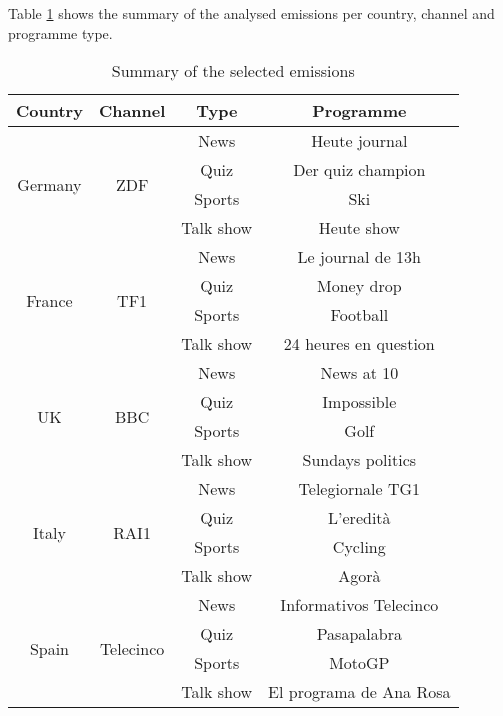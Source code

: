 Table \ref{tab:selEmissions} shows the summary of the analysed emissions per country, channel and programme type. 

\begin{table}[ht]
	\begin{center}
		\caption{Summary of the selected emissions}
		\label{tab:selEmissions}
		\begin{tabular}{||c|c|c|c||}
			\hline
			\textbf{Country} & \textbf{Channel} & \textbf{Type} & \textbf{Programme} \\
			\hline
			\multirow{4}{*}{Germany}   & \multirow{4}{*}{ZDF}   & News             & Heute journal \\ 
			&  & Quiz & Der quiz champion \\
			&  & Sports & Ski \\
			&  & Talk show & Heute show \\
			\hline
			\multirow{4}{*}{France}    & \multirow{4}{*}{TF1}              & News             & Le journal de 13h  \\ 
			&  & Quiz & Money drop \\
			&  & Sports & Football \\
			&  & Talk show & 24 heures en question \\
			\hline
			\multirow{4}{*}{UK}        & \multirow{4}{*}{BBC}              & News             & News at 10  \\ 
			&  & Quiz & Impossible\\
			&  & Sports & Golf \\
			&  & Talk show & Sundays politics \\
			\hline
			\multirow{4}{*}{Italy}     & \multirow{4}{*}{RAI1}             & News             & Telegiornale TG1  \\ 
			&  & Quiz & L'eredità \\
			&  & Sports & Cycling \\
			&  & Talk show & Agorà \\
			\hline
			\multirow{4}{*}{Spain}     & \multirow{4}{*}{Telecinco}        & News             & Informativos Telecinco  \\ 
			&  & Quiz & Pasapalabra \\
			&  & Sports & MotoGP \\
			&  & Talk show & El programa de Ana Rosa  \\
			\hline
		\end{tabular}
	\end{center}
\end{table}

